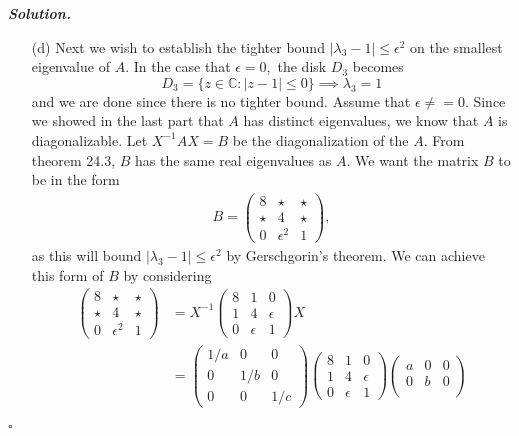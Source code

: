 \documentclass[12pt]{report}
\newenvironment{solution}[1][\it{Solution}]{\textbf{#1. } }{$\square$}
\def\C{{\mathbb C}}
\begin{document}
\begin{solution}
\begin{enumerate}
        \item [(d)]
        Next we wish to establish the tighter bound $|\lambda_3 - 1| \leq \epsilon^2$ on the smallest eigenvalue of $A$. In the case that $\epsilon = 0,$ the disk $D_3$ becomes
        \[ D_3 = \{z \in \C : |z - 1| \leq 0 \} \implies \lambda_3 = 1\]
        and we are done since there is no tighter bound. Assume that $\epsilon \neq =0$. Since we showed in the last part that $A$ has distinct eigenvalues, we know that $A$ is diagonalizable. Let $X^{-1}AX = B$ be the diagonalization of the $A$. From theorem 24.3, $B$ has the same real eigenvalues as $A$. We want the matrix $B$ to be in the form
        \begin{align*}
            B = \begin{pmatrix}
                8 & \star & \star\\
                \star & 4 & \star\\
                0 & \epsilon^2 & 1
            \end{pmatrix},
        \end{align*}
        as this will bound $|\lambda_3 - 1| \leq \epsilon^2$ by Gerschgorin's theorem. We can achieve this form of $B$ by considering
        \begin{align*}
            \begin{pmatrix}
                8 & \star & \star\\
                \star & 4 & \star\\
                0 & \epsilon^2 & 1
            \end{pmatrix} &= X^{-1}\begin{pmatrix}8&1&0\\1&4&\epsilon\\0&\epsilon&1 \end{pmatrix}X\\
            &=\begin{pmatrix}
                1/a & 0 & 0 \\
                0 & 1/b & 0\\
                0 & 0 & 1/c
            \end{pmatrix}\begin{pmatrix}8&1&0\\1&4&\epsilon\\0&\epsilon&1 \end{pmatrix}\begin{pmatrix}
                a&0&0\\
                0&b&0\\

\end{pmatrix}
\end{align*}
\end{enumerate}
\end{solution}
\end{document}
